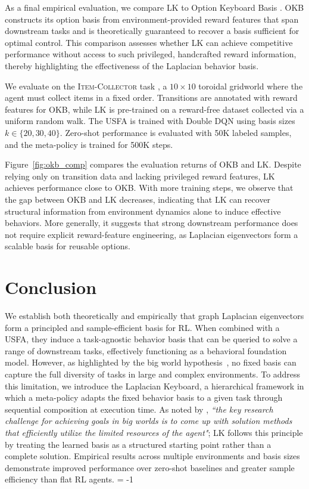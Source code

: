 \documentclass{article}
\theoremstyle{plain}
\theoremstyle{definition}
\theoremstyle{remark}
\begin{document}
As a final empirical evaluation, we compare LK to Option Keyboard Basis \citep[OKB;][]{alegre2025constructing}. OKB constructs its option basis from environment-provided reward features that span downstream tasks and is theoretically guaranteed to recover a basis sufficient for optimal control. This comparison assesses whether LK can achieve competitive performance without access to such privileged, handcrafted reward information, thereby highlighting the effectiveness of the Laplacian behavior basis.

We evaluate on the \textsc{Item-Collector} task \cite{barreto2019option, alegre2025constructing}, a $10\times10$ toroidal gridworld where the agent must collect items in a fixed order. Transitions are annotated with reward features for OKB, while LK is pre-trained on a reward-free dataset collected via a uniform random walk. The USFA is trained with Double DQN \citep{van2016deep} using basis sizes $k \in \{20,30,40\}$. Zero-shot performance is evaluated with 50K labeled samples, and the meta-policy is trained for 500K steps.

Figure~\ref{fig:okb_comp} compares the evaluation returns of OKB and LK. Despite relying only on transition data and lacking privileged reward features, LK achieves performance close to OKB. With more training steps, we observe that the gap between OKB and LK decreases, indicating that LK can recover structural information from environment dynamics alone to induce effective behaviors. More generally, it suggests that strong downstream performance does not require explicit reward-feature engineering, as Laplacian eigenvectors form a scalable basis for reusable options.


\section{Conclusion}

We establish both theoretically and empirically that graph Laplacian eigenvectors form a principled and sample-efficient basis for RL. When combined with a USFA, they induce a task-agnostic behavior basis that can be queried to solve a range of downstream tasks, effectively functioning as a behavioral foundation model. However, as highlighted by the big world hypothesis~\citep{javed2024big}, no fixed basis can capture the full diversity of tasks in large and complex environments. To address this limitation, we introduce the Laplacian Keyboard, a hierarchical framework in which a meta-policy adapts the fixed behavior basis to a given task through sequential composition at execution time. As noted by \citet{javed2024big}, \textit{``the key research challenge for achieving goals in big worlds is to come up with solution methods that efficiently utilize the limited resources of the agent"}; LK follows this principle by treating the learned basis as a structured starting point rather than a complete solution. Empirical results across multiple environments and basis sizes demonstrate improved performance over zero-shot baselines and greater sample efficiency than flat RL agents. \looseness = -1
\end{document}
